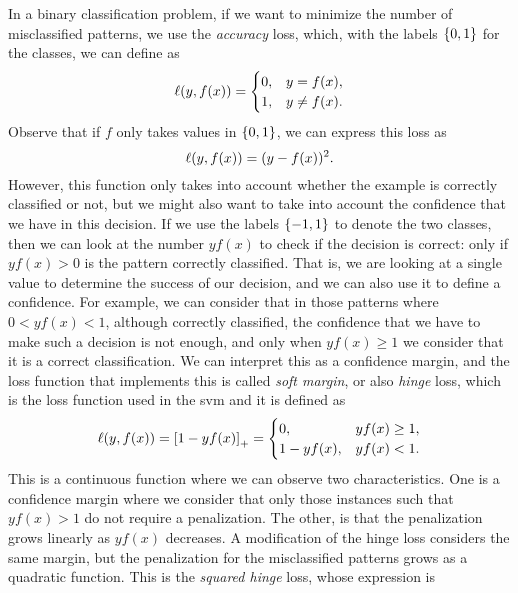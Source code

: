In a binary classification problem, if we want to minimize the number of misclassified patterns, we use the \emph{accuracy} loss, which, with the labels $\left\{0, 1\right\}$ for the classes, we can define as
\begin{equation}
    \nonumber
    \ell(y, f(x)) =
    \begin{cases}
        0, & y = f(x) ,\\
        1, & y \neq f(x) .
    \end{cases}
\end{equation}
Observe that if $f$ only takes values in $\left\{0, 1\right\}$, we can express this loss as 
\begin{equation}
    \nonumber
    \ell(y, f(x)) = (y - f(x))^2 .
\end{equation}
However, this function only takes into account whether the example is correctly classified or not, but we might also want to take into account the confidence that we have in this decision. If we use the labels $\left\{-1, 1\right\}$ to denote the two classes, then we can look at the number $y f(x)$ to check if the decision is correct: only if $y f(x) > 0$ is the pattern correctly classified. That is, we are looking at a single value to determine the success of our decision, and we can also use it to define a confidence. For example, we can consider that in those patterns where $0 < y f(x) < 1$, although correctly classified, the confidence that we have to make such a decision is not enough, and only when $y f(x) \geq 1$ we consider that it is a correct classification. We can interpret this as a confidence margin, and the loss function that implements this is called \emph{soft margin}, or also \emph{hinge} loss, which is the loss function used in the \acrshort{svm} and it is defined as
\begin{equation}
    \label{eq:hinge_def}
    \lossf(y, f(x)) = \pospart{1 - yf(x)} = 
    \begin{cases}
        0, & y f(x) \geq 1 ,\\
        1 - y f(x), & y f(x) < 1 .
    \end{cases}
\end{equation}
This is a continuous function where we can observe two characteristics. One is a confidence margin where we consider that only those instances such that $y f(x) > 1$ do not require a penalization. The other, is that the penalization grows linearly as $y f(x)$ decreases.
%
A modification of the hinge loss considers the same margin, but the penalization for the misclassified patterns grows as a quadratic function. This is the \emph{squared hinge} loss, whose expression is
